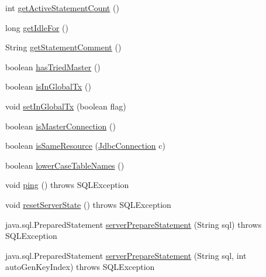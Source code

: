 \begin{DoxyCompactItemize}
\item 
int \mbox{\hyperlink{interfacecom_1_1mysql_1_1cj_1_1jdbc_1_1_jdbc_connection_aea218879f6bae7ed7717a257876582db}{get\+Active\+Statement\+Count}} ()
\item 
long \mbox{\hyperlink{interfacecom_1_1mysql_1_1cj_1_1jdbc_1_1_jdbc_connection_a3a242d2fb1e6c443f163d55f8bbd6cde}{get\+Idle\+For}} ()
\item 
String \mbox{\hyperlink{interfacecom_1_1mysql_1_1cj_1_1jdbc_1_1_jdbc_connection_a11233536b54479183feb8eda938f72e9}{get\+Statement\+Comment}} ()
\item 
boolean \mbox{\hyperlink{interfacecom_1_1mysql_1_1cj_1_1jdbc_1_1_jdbc_connection_ab7d858b77e30de81f7ec67504ba89b0c}{has\+Tried\+Master}} ()
\item 
boolean \mbox{\hyperlink{interfacecom_1_1mysql_1_1cj_1_1jdbc_1_1_jdbc_connection_a919152df37a4bf60c12c0818256a90a3}{is\+In\+Global\+Tx}} ()
\item 
void \mbox{\hyperlink{interfacecom_1_1mysql_1_1cj_1_1jdbc_1_1_jdbc_connection_af7cff3ba67d2b787b04c3eff40f9e087}{set\+In\+Global\+Tx}} (boolean flag)
\item 
boolean \mbox{\hyperlink{interfacecom_1_1mysql_1_1cj_1_1jdbc_1_1_jdbc_connection_a012dc133872dd4d6db6d6f98118d3251}{is\+Master\+Connection}} ()
\item 
boolean \mbox{\hyperlink{interfacecom_1_1mysql_1_1cj_1_1jdbc_1_1_jdbc_connection_a90906591d933e0d9f10dbb9db6b5a83a}{is\+Same\+Resource}} (\mbox{\hyperlink{interfacecom_1_1mysql_1_1cj_1_1jdbc_1_1_jdbc_connection}{Jdbc\+Connection}} c)
\item 
boolean \mbox{\hyperlink{interfacecom_1_1mysql_1_1cj_1_1jdbc_1_1_jdbc_connection_a54cca6407a1a531b8e65ee3d965a51cd}{lower\+Case\+Table\+Names}} ()
\item 
void \mbox{\hyperlink{interfacecom_1_1mysql_1_1cj_1_1jdbc_1_1_jdbc_connection_a6d078258f83ddc438d64bafb0f665004}{ping}} ()  throws S\+Q\+L\+Exception
\item 
void \mbox{\hyperlink{interfacecom_1_1mysql_1_1cj_1_1jdbc_1_1_jdbc_connection_a44456aec7737354a14eff20638c047fa}{reset\+Server\+State}} ()  throws S\+Q\+L\+Exception
\item 
java.\+sql.\+Prepared\+Statement \mbox{\hyperlink{interfacecom_1_1mysql_1_1cj_1_1jdbc_1_1_jdbc_connection_add415475386bd7577301fddbdd5518b8}{server\+Prepare\+Statement}} (String sql)  throws S\+Q\+L\+Exception
\item 
java.\+sql.\+Prepared\+Statement \mbox{\hyperlink{interfacecom_1_1mysql_1_1cj_1_1jdbc_1_1_jdbc_connection_a9deb2cebf6538a53be5f24c52ee39f22}{server\+Prepare\+Statement}} (String sql, int auto\+Gen\+Key\+Index)  throws S\+Q\+L\+Exception

\end{DoxyCompactItemize}
